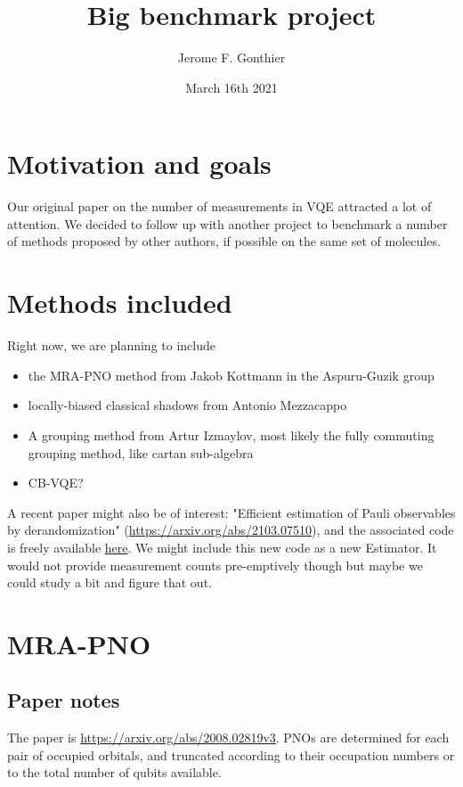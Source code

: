\documentclass{article}
\title{Big benchmark project}
\author{Jerome F. Gonthier}
\date{March 16th 2021}
\begin{document}
\maketitle

\section{Motivation and goals}

Our original paper on the number of measurements in VQE attracted a lot of attention. We decided to follow up with another project to benchmark a number of methods proposed by other authors, if possible on the same set of molecules.

\section{Methods included}

Right now, we are planning to include 
\begin{itemize}
\item the MRA-PNO method from Jakob Kottmann in the Aspuru-Guzik group
\item locally-biased classical shadows from Antonio Mezzacappo
\item A grouping method from Artur Izmaylov, most likely the fully commuting grouping method, like cartan sub-algebra
\item CB-VQE?
\end{itemize}

A recent paper might also be of interest: "Efficient estimation of Pauli observables by derandomization" (\href{https://arxiv.org/abs/2103.07510}{https://arxiv.org/abs/2103.07510}), and the associated code is freely available \href{https://github.com/momohuang/predicting-quantum-properties}{here}.
We might include this new code as a new Estimator. It would not provide measurement counts pre-emptively though but maybe we could study a bit and figure that out.

\section{MRA-PNO}

\subsection{Paper notes}

The paper is \href{https://arxiv.org/abs/2008.02819}{https://arxiv.org/abs/2008.02819v3}. PNOs are determined for each pair of occupied orbitals, and truncated according to their occupation numbers or to the total number of qubits available.
\end{document}
